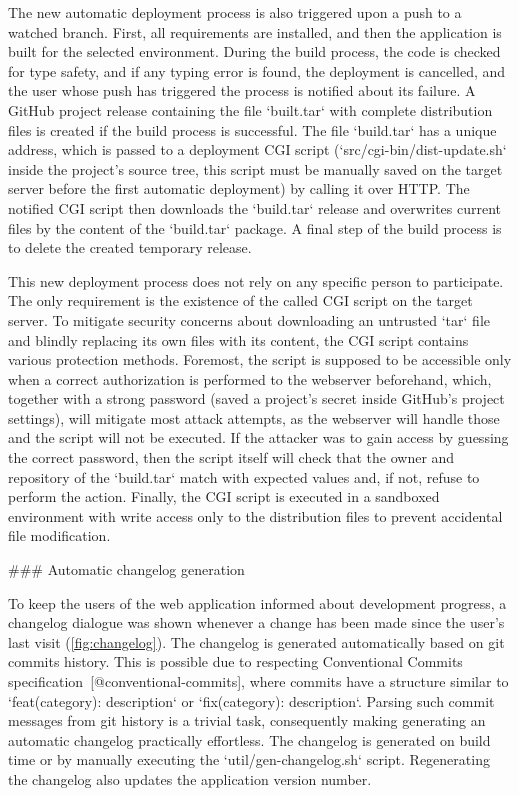 \documentclass[
  digital, %
  oneside, %
  lof,     %
  nolot,     %
]{fithesis4}
\begin{document}
{The new automatic deployment process is also triggered upon a push to a watched branch. First, all requirements are installed, and then the application is built for the selected environment. During the build process, the code is checked for type safety, and if any typing error is found, the deployment is cancelled, and the user whose push has triggered the process is notified about its failure. A GitHub project release containing the file `built.tar` with complete distribution files is created if the build process is successful. The file `build.tar` has a unique address, which is passed to a deployment CGI script (`src/cgi-bin/dist-update.sh` inside the project's source tree, this script must be manually saved on the target server before the first automatic deployment) by calling it over HTTP. The notified CGI script then downloads the `build.tar` release and overwrites current files by the content of the `build.tar` package. A final step of the build process is to delete the created temporary release.

This new deployment process does not rely on any specific person to participate. The only requirement is the existence of the called CGI script on the target server. To mitigate security concerns about downloading an untrusted `tar` file and blindly replacing its own files with its content, the CGI script contains various protection methods. Foremost, the script is supposed to be accessible only when a correct authorization is performed to the webserver beforehand, which, together with a strong password (saved a project's secret inside GitHub's project settings), will mitigate most attack attempts, as the webserver will handle those and the script will not be executed. If the attacker was to gain access by guessing the correct password, then the script itself will check that the owner and repository of the `build.tar` match with expected values and, if not, refuse to perform the action. Finally, the CGI script is executed in a sandboxed environment with write access only to the distribution files to prevent accidental file modification.

### Automatic changelog generation
\label{chap:changelog}

To keep the users of the web application informed about development progress, a changelog dialogue was shown whenever a change has been made since the user's last visit (\autoref{fig:changelog}). The changelog is generated automatically based on git commits history. This is possible due to respecting Conventional Commits specification~[@conventional-commits], where commits have a structure similar to `feat(category): description` or `fix(category): description`. Parsing such commit messages from git history is a trivial task, consequently making generating an automatic changelog practically effortless. The changelog is generated on build time or by manually executing the `util/gen-changelog.sh` script. Regenerating the changelog also updates the application version number.

}
\end{document}

